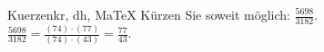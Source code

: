 \begin{MAufgabe}{Kuerzen}{kr, dh, MaTeX}
K\"urzen Sie soweit m\"oglich: $\frac{5698}{3182}$.\\ 
\ifLsg\MLoesung
\quad $\frac{5698}{3182}=\frac{(74)\cdot(77)}{(74)\cdot(43)}=\frac{77}{43}$.\else\relax\fi
 \end{MAufgabe}